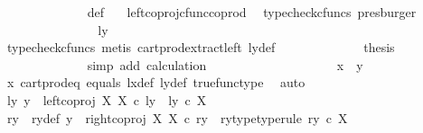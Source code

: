 \begin{isabellebody}
\ \ \ \ \ \ \ \ \ \ \ \ \isamarkupfalse%
\ {\isasymrho}{\isacharunderscore}{\kern0pt}def\ \ \isamarkupfalse%
\ left{\isacharunderscore}{\kern0pt}coproj{\isacharunderscore}{\kern0pt}cfunc{\isacharunderscore}{\kern0pt}coprod\ \isamarkupfalse%
\ {\isacharparenleft}{\kern0pt}typecheck{\isacharunderscore}{\kern0pt}cfuncs{\isacharcomma}{\kern0pt}\ presburger{\isacharparenright}{\kern0pt}\isanewline
\ \ \ \ \ \ \ \ \ \ \isamarkupfalse%
\ \isamarkupfalse%
\ {\isachardoublequoteopen}{\isachardot}{\kern0pt}{\isachardot}{\kern0pt}{\isachardot}{\kern0pt}\ {\isacharequal}{\kern0pt}\ {\isasymlangle}ly{\isacharcomma}{\kern0pt}\ {\isasymt}{\isasymrangle}{\isachardoublequoteclose}\isanewline
\ \ \ \ \ \ \ \ \ \ \ \ \isamarkupfalse%
\ {\isacharparenleft}{\kern0pt}typecheck{\isacharunderscore}{\kern0pt}cfuncs{\isacharcomma}{\kern0pt}\ metis\ cart{\isacharunderscore}{\kern0pt}prod{\isacharunderscore}{\kern0pt}extract{\isacharunderscore}{\kern0pt}left\ ly{\isacharunderscore}{\kern0pt}def{\isacharparenright}{\kern0pt}\isanewline
\ \ \ \ \ \ \ \ \ \ \isamarkupfalse%
\ \isamarkupfalse%
\ {\isacharquery}{\kern0pt}thesis\isanewline
\ \ \ \ \ \ \ \ \ \ \ \ \isamarkupfalse%
\ {\isacharparenleft}{\kern0pt}simp\ add{\isacharcolon}{\kern0pt}\ calculation{\isacharparenright}{\kern0pt}\isanewline
\ \ \ \ \ \ \ \ \isamarkupfalse%
\isanewline
\ \ \ \ \ \ \ \ \isamarkupfalse%
\ \isamarkupfalse%
\ {\isachardoublequoteopen}x\ {\isacharequal}{\kern0pt}\ y{\isachardoublequoteclose}\isanewline
\ \ \ \ \ \ \ \ \ \ \isamarkupfalse%
\ {\isasymrho}x\ cart{\isacharunderscore}{\kern0pt}prod{\isacharunderscore}{\kern0pt}eq{}\ equals\ lx{\isacharunderscore}{\kern0pt}def\ ly{\isacharunderscore}{\kern0pt}def\ true{\isacharunderscore}{\kern0pt}func{\isacharunderscore}{\kern0pt}type\ \isamarkupfalse%
\ auto\isanewline
\ \ \ \ \ \ \isamarkupfalse%
\isanewline
\ \ \ \ \ \ \ \ \isamarkupfalse%
\ {\isachardoublequoteopen}{\isasymnexists}ly{\isachardot}{\kern0pt}\ y\ {\isacharequal}{\kern0pt}\ left{\isacharunderscore}{\kern0pt}coproj\ X\ X\ {\isasymcirc}\isactrlsub c\ ly\ {\isasymand}\ ly\ {\isasymin}\isactrlsub c\ X{\isachardoublequoteclose}\isanewline
\ \ \ \ \ \ \ \ \isamarkupfalse%
\ \isamarkupfalse%
\ ry\ \ ry{\isacharunderscore}{\kern0pt}def{\isacharcolon}{\kern0pt}\ {\isachardoublequoteopen}y\ {\isacharequal}{\kern0pt}\ right{\isacharunderscore}{\kern0pt}coproj\ X\ X\ {\isasymcirc}\isactrlsub c\ ry{\isachardoublequoteclose}\ \ ry{\isacharunderscore}{\kern0pt}type{\isacharbrackleft}{\kern0pt}type{\isacharunderscore}{\kern0pt}rule{\isacharbrackright}{\kern0pt}{\isacharcolon}{\kern0pt}\ {\isachardoublequoteopen}ry\ {\isasymin}\isactrlsub c\ X{\isachardoublequoteclose}\isanewline

\end{isabellebody}
